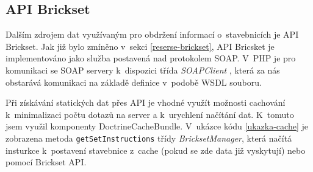 
\subsection{API Brickset}
Dalším zdrojem dat využívaným pro obdržení informací o~stavebnicích je API Brickset. Jak již bylo zmíněno v~sekci \ref{reserse-brickset}, API Bricsket je implementováno jako služba postavená nad protokolem \gls{SOAP}. V~PHP je pro komunikaci se SOAP servery k~dispozici třída \textit{SOAPClient} \autocite{soapclient}, která za nás obstarává komunikaci na základě definice v~podobě \gls{WSDL} souboru. 

Při získávání statických dat přes API je vhodné využít možnosti cachování k~minimalizaci počtu dotazů na server a k~urychlení načítání dat. K~tomuto jsem využil komponenty DoctrineCacheBundle. V~ukázce kódu \ref{ukazka-cache} je zobrazena metoda \texttt{getSetInstructions} třídy \textit{BricksetManager}, která načítá insturkce k~postavení stavebnice z~cache (pokud se zde data již vyskytují) nebo pomocí Brickset API. 

